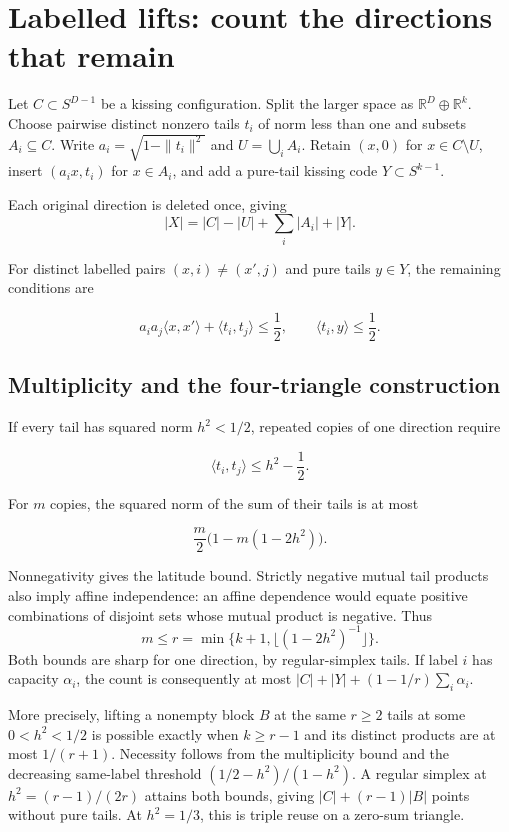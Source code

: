 \section{Labelled lifts: count the directions that
remain}

Let \(C\subset S^{D-1}\) be a kissing configuration. Split the larger
space as \(\mathbb R^D\oplus\mathbb R^k\). Choose pairwise distinct
nonzero tails \(t_i\) of norm less than one and subsets
\(A_i\subseteq C\). Write \(a_i=\sqrt{1-\|t_i\|^2}\) and
\(U=\bigcup_iA_i\). Retain \((x,0)\) for \(x\in C\setminus U\), insert
\((a_ix,t_i)\) for \(x\in A_i\), and add a pure-tail kissing code
\(Y\subset S^{k-1}\).

Each original direction is deleted once, giving
\[
|X|=|C|-|U|+\sum_i|A_i|+|Y|.
\]

For distinct labelled pairs \((x,i)\ne(x',j)\) and pure tails
\(y\in Y\), the remaining conditions are

\[
a_ia_j\langle x,x'\rangle+\langle t_i,t_j\rangle\le\frac12,
\qquad
\langle t_i,y\rangle\le\frac12.
\]

\subsection{Multiplicity and the four-triangle
construction}

If every tail has squared norm \(h^2<1/2\), repeated copies of one
direction require

\[
\langle t_i,t_j\rangle\le h^2-\frac12.
\]

For \(m\) copies, the squared norm of the sum of their tails is at most

\[
\frac m2\bigl(1-m(1-2h^2)\bigr).
\]

Nonnegativity gives the latitude bound. Strictly negative mutual tail
products also imply affine independence: an affine dependence would
equate positive combinations of disjoint sets whose mutual product is
negative. Thus
\[
m\le r=\min\{k+1,\lfloor(1-2h^2)^{-1}\rfloor\}.
\]
Both bounds are sharp for one direction, by regular-simplex tails.
If label $i$ has capacity $\alpha_i$, the count is consequently at most
$|C|+|Y|+(1-1/r)\sum_i\alpha_i$.

More precisely, lifting a nonempty block $B$ at the same $r\ge2$ tails
at some $0<h^2<1/2$ is possible exactly when $k\ge r-1$ and its
distinct products are at most $1/(r+1)$. Necessity follows from the
multiplicity bound and the decreasing same-label threshold
$(1/2-h^2)/(1-h^2)$. A regular simplex at
$h^2=(r-1)/(2r)$ attains both bounds, giving $|C|+(r-1)|B|$ points
without pure tails. At $h^2=1/3$, this is triple reuse on a zero-sum triangle.

